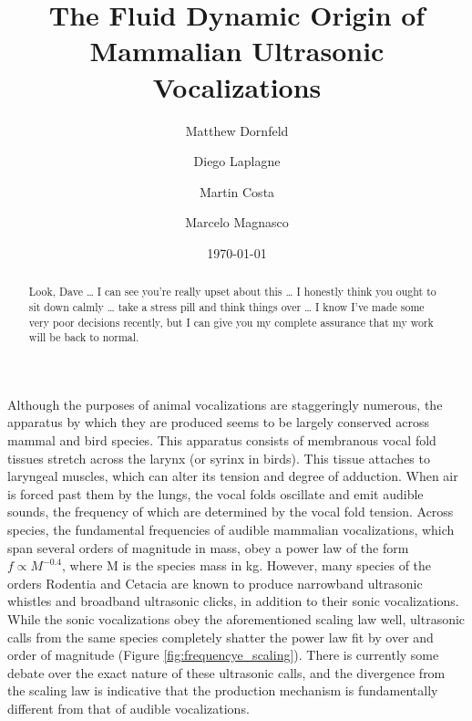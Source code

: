\documentclass[twocolumn, prX]{revtex4}
\begin{document}
\title{The Fluid Dynamic Origin of Mammalian Ultrasonic Vocalizations}

\author{Matthew Dornfeld}

\author{Diego Laplagne}

\author{Martin Costa} 

\author{Marcelo Magnasco}
\date{\today}
\begin{abstract}
Look, Dave … I can see you’re really upset about this … I honestly think you ought to sit down calmly … take a stress pill and think things over … I know I’ve made some very poor decisions recently, but I can give you my complete assurance that my work will be back to normal.
\end{abstract}
\maketitle
Although the purposes of animal vocalizations are staggeringly numerous, the apparatus by which they are produced seems to be largely conserved across mammal and bird species. This apparatus consists of membranous vocal fold tissues stretch across the larynx (or syrinx in birds). This tissue attaches to laryngeal muscles, which can alter its tension and degree of adduction. When air is forced past them by the lungs, the vocal folds oscillate and emit audible sounds, the frequency of which are determined by the vocal fold tension. Across species, the fundamental frequencies of audible mammalian vocalizations, which span several orders of magnitude in mass, obey a power law of the form $f\propto M^{-0.4}$, where M is the species mass in kg. However, many species of the orders Rodentia and Cetacia are known to produce narrowband ultrasonic whistles and broadband ultrasonic clicks, in addition to their sonic vocalizations. While the sonic vocalizations obey the aforementioned scaling law well, ultrasonic calls from the same species completely shatter the power law fit by over and order of magnitude (Figure \ref{fig:frequencye_scaling}). There is currently some debate over the exact nature of these ultrasonic calls, and the divergence from the scaling law is indicative that the production mechanism is fundamentally different from that of audible vocalizations.
\end{document}
